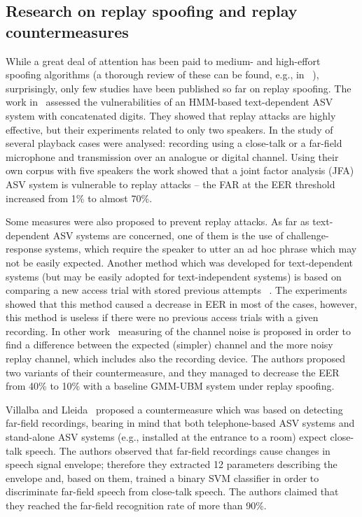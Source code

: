 \subsection{Research on replay spoofing and replay countermeasures}

While a great deal of attention has been paid to medium- and high-effort spoofing algorithms (a thorough review of these can be found, e.g., in ~\cite{interspeechSpecialSession}), surprisingly, only few studies have been published so far on replay spoofing. The work in~\cite{Lindberg1999} assessed the vulnerabilities of an HMM-based text-dependent ASV system with concatenated digits. They showed that replay attacks are highly effective, but their experiments related to only two speakers. In the study of~\cite{Villalba2010} several playback cases were analysed: recording using a close-talk or a far-field microphone and transmission over an analogue or digital channel. Using their own corpus with five speakers the work showed that a joint factor analysis (JFA) ASV system is vulnerable to replay attacks -- the FAR at the EER threshold increased from 1\% to almost 70\%. 

Some measures were also proposed to prevent replay attacks. As far as text-dependent ASV systems are concerned, one of them is the use of challenge-response systems, which require the speaker to utter an ad hoc phrase which may not be easily expected. Another method which was developed for text-dependent systems (but may be easily adopted for text-independent systems) is based on comparing a new access trial with stored previous attempts ~\cite{Shang2010}. The experiments showed that this method caused a decrease in EER in  most of the cases, however, this method is useless if there were no previous access trials with a given recording. In other work~\cite{Wang2011} measuring of the channel noise is proposed in order to find a difference between the expected (simpler) channel and the more noisy replay channel, which includes also the recording device. The authors proposed two variants of their countermeasure, and they managed to decrease the EER from 40\% to 10\% with a baseline GMM-UBM system under replay spoofing.

Villalba and Lleida~\cite{Villalba2011} proposed a countermeasure which was based on detecting far-field recordings, bearing in mind that both telephone-based ASV systems and stand-alone ASV systems (e.g., installed at the entrance to a room) expect close-talk speech. The authors observed that far-field recordings cause changes in speech signal envelope; therefore they extracted 12 parameters describing the envelope and, based on them, trained a binary SVM classifier in order to discriminate far-field speech from close-talk speech. The authors claimed that they reached the far-field recognition rate of more than 90\%.



